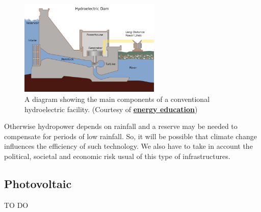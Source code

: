 \begin{figure}[h]
    \centering
    \includegraphics[width=0.6\textwidth]{Chapters/Pictures/Damparts.png}
    \caption{\small{A diagram showing the main components of a conventional hydroelectric facility.
    (Courtesy of \textbf{\href{https://energyeducation.ca/wiki/images/8/8e/Damparts.png}{energy education}})}}
    \label{fig:dam}
\end{figure}

Otherwise hydropower depends on rainfall and a reserve may be needed to compensate for periods of low rainfall. So, it will be possible that climate change influences the efficiency of such technology. We also have to take in account the political, societal and economic risk usual of this type of infrastructures.

\subsection{Photovoltaic}

\Huge{TO DO}